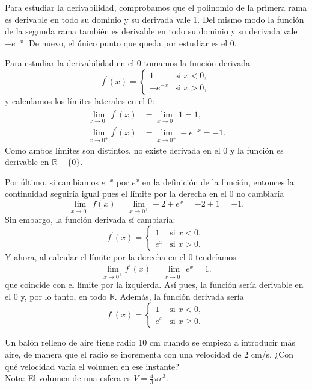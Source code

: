 {Para estudiar la derivabilidad, comprobamos que el polinomio de la primera rama es derivable en todo su dominio y su derivada vale 1. Del mismo modo la función de la segunda rama también es derivable en todo su dominio y su derivada vale $-e^{-x}$. De nuevo, el único punto que queda por estudiar es el 0.

Para estudiar la derivabilidad en el 0 tomamos la función derivada 
\[
f^{\prime }(x)=
\begin{cases}
1 & \mbox{si $x<0$}, \\ 
-e^{-x} & \mbox{si $x>0$},
\end{cases}
\]
y calculamos los límites laterales en el 0: 
\begin{align*}
\lim_{x\rightarrow 0^{-}}f^{\prime }(x) &= \lim_{x\rightarrow 0^{-}}1=1, \\
\lim_{x\rightarrow 0^{+}}f^{\prime }(x) &= \lim_{x\rightarrow 0^{+}}-e^{-x}=-1.
\end{align*}
Como ambos límites son distintos, no existe derivada en el 0 y la función es derivable en $\mathbb{R}-\{0\}$.

Por último, si cambiamos $e^{-x}$ por $e^{x}$ en la definición de la función, entonces la continuidad seguiría igual pues el límite por la derecha en el 0 no cambiaría
\[
\lim_{x\rightarrow 0^{+}}f(x) = \lim_{x\rightarrow 0^{+}}-2+e^{x}=-2+1=-1.
\]
Sin embargo, la función derivada sí cambiaría: 
\[
f^{\prime }(x)= 
\begin{cases}
1 & \mbox{si $x<0$}, \\ 
e^{x} & \mbox{si $x>0$}.
\end{cases}
\]
Y ahora, al calcular el límite por la derecha en el 0 tendríamos
\[
\lim_{x\rightarrow 0^{+}}f^{\prime }(x) = \lim_{x\rightarrow 0^{+}}e^{x}=1.
\]
que coincide con el límite por la izquierda. Así pues, la función sería derivable en el 0 y, por lo tanto, en todo $\mathbb{R}$.
Además, la función derivada sería 
\[
f^{\prime }(x)= 
\begin{cases}
1 & \mbox{si $x<0$}, \\ 
e^{x} & \mbox{si $x\geq 0$}.
\end{cases}
\]
}


{Un balón relleno de aire tiene radio 10 cm cuando se empieza a introducir más aire, de manera que el radio se incrementa con una velocidad de 2 cm/s. 
¿Con qué velocidad varía el volumen en ese instante? \\
Nota: El volumen de una esfera es $V=\frac{4}{3}\pi r^3$.
}
{
}
{
}


